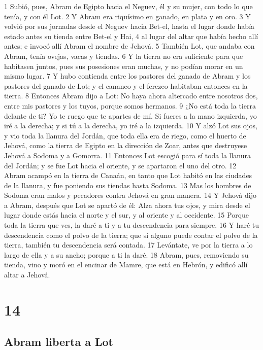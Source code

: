 1 Subió, pues, Abram de Egipto hacia el Neguev, él y su mujer, con todo lo que tenía, y con él Lot.
2 Y Abram era riquísimo en ganado, en plata y en oro.
3 Y volvió por sus jornadas desde el Neguev hacia Bet-el, hasta el lugar donde había estado antes su tienda entre Bet-el y Hai,
4 al lugar del altar que había hecho allí antes; e invocó allí Abram el nombre de Jehová.
5 También Lot, que andaba con Abram, tenía ovejas, vacas y tiendas.
6 Y la tierra no era suficiente para que habitasen juntos, pues sus posesiones eran muchas, y no podían morar en un mismo lugar.
7 Y hubo contienda entre los pastores del ganado de Abram y los pastores del ganado de Lot; y el cananeo y el ferezeo habitaban entonces en la tierra.
8 Entonces Abram dijo a Lot: No haya ahora altercado entre nosotros dos, entre mis pastores y los tuyos, porque somos hermanos.
9 ¿No está toda la tierra delante de ti? Yo te ruego que te apartes de mí. Si fueres a la mano izquierda, yo iré a la derecha; y si tú a la derecha, yo iré a la izquierda.
10 Y alzó Lot sus ojos, y vio toda la llanura del Jordán, que toda ella era de riego, como el huerto de Jehová, como la tierra de Egipto en la dirección de Zoar, antes que destruyese Jehová a Sodoma y a Gomorra.
11 Entonces Lot escogió para sí toda la llanura del Jordán; y se fue Lot hacia el oriente, y se apartaron el uno del otro.
12 Abram acampó en la tierra de Canaán, en tanto que Lot habitó en las ciudades de la llanura, y fue poniendo sus tiendas hasta Sodoma.
13 Mas los hombres de Sodoma eran malos y pecadores contra Jehová en gran manera.
14 Y Jehová dijo a Abram, después que Lot se apartó de él: Alza ahora tus ojos, y mira desde el lugar donde estás hacia el norte y el sur, y al oriente y al occidente.
15 Porque toda la tierra que ves, la daré a ti y a tu descendencia para siempre.
16 Y haré tu descendencia como el polvo de la tierra; que si alguno puede contar el polvo de la tierra, también tu descendencia será contada.
17 Levántate, ve por la tierra a lo largo de ella y a su ancho; porque a ti la daré.
18 Abram, pues, removiendo su tienda, vino y moró en el encinar de Mamre, que está en Hebrón, y edificó allí altar a Jehová.

\chapter{14}

\section*{Abram liberta a Lot}

